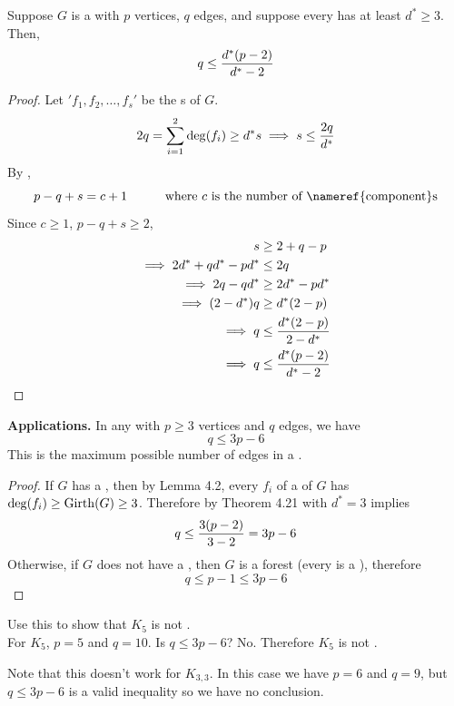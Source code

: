 \documentclass[english, 11pt]{article}
\begin{document}
 \begin{thrm}
   Suppose $G$ is a  with $p$ vertices, $q$ edges, and suppose every  has  at least $d^* \geq 3$. Then,
   \[ q \le \frac{d^*(p-2)}{d^* - 2} \]
 \end{thrm}
 \begin{proof}
   Let $'f_1, f_2, \ldots, f_s'$ be the s of $G$.
   \[ 2q = \sum_{i = 1}^2\deg(f_i) \geq d^* s \implies s \leq \frac{2q}{d^*} \]
   By ,
   \[ p - q + s = c + 1 \ \ \ \ \ \ \ \ \ \mbox{where $c$ is the number of \nameref{component}s} \]
   Since $c \geq 1$, $p - q + s \geq 2$,
   \begin{align*}
     s & \geq 2 + q - p \\
     \implies 2d^* + qd^* - pd^* & \leq 2q \\
     \implies 2q - qd^* &\geq 2d^* - pd^* \\
     \implies (2-d^*)q &\geq d^*(2-p) \\
     \implies q &\leq \frac{d^*(2-p)}{2-d^*} \\
     \implies q & \leq \frac{d^*(p-2)}{d^* - 2}
   \end{align*}
 \end{proof}

 \textbf{Applications.} In any  with $p \geq 3$ vertices and $q$ edges, we have
 \[ q \leq 3p - 6 \]
 This is the maximum possible number of edges in a .
 \begin{proof}
   If $G$ has a , then by Lemma 4.2, every  $f_i$ of a  of $G$ has $\deg(f_i) \geq \operatorname{Girth}(G) \geq 3$. Therefore by Theorem 4.21 with $d^* = 3$ implies
   \[ q \leq \frac{3(p-2)}{3-2} = 3p - 6 \]
   Otherwise, if $G$ does not have a , then $G$ is a forest (every  is a ), therefore
   \[ q \leq p - 1 \leq 3p - 6 \]
 \end{proof}
 \begin{exmp}
    Use this to show that $K_5$ is not . \\

    For $K_5$, $p = 5$ and $q = 10$. Is $q \leq 3p - 6$? No. Therefore $K_5$ is not .
  \end{exmp}

  Note that this doesn't work for $K_{3,3}$. In this case we have $p = 6$ and $q = 9$, but $q \leq 3p - 6$ is a valid inequality so we have no conclusion.\\
\end{document}
